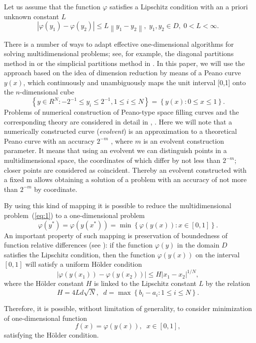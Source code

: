 \documentclass[smallcondensed]{svjour3}     %
\begin{document}
Let us assume that the function $\varphi$ satisfies a Lipschitz condition with an a priori unknown constant $L$
\[
\left|\varphi(y_1)-\varphi(y_2)\right|\leq L\left\|y_1-y_2\right\|,\; y_1,y_2 \in D,\; 0<L<\infty.
\]

There is a number of ways to adapt effective one-dimensional algorithms for solving multidimensional problems; see, for example, the diagonal partitions method in \cite{RefSergeyev2006} or the simplicial partitions method in \cite{RefZilinskas}. In this paper, we will use the approach based on the idea of dimension reduction by means of a Peano curve $y(x)$, which continuously and unambiguously maps the unit interval [0,1] onto the $n$-dimensional cube
\[
\left\{y\in R^N: -2^{-1}\leq y_i \leq 2^{-1}, 1 \leq i \leq N\right\}=\left\{y(x):0\leq x \leq 1 \right\}.
\]
Problems of numerical construction of Peano-type space filling curves and the corresponding theory are considered in detail in \cite{RefStrongin2000}, \cite{RefSergeyev2013}. Here we will note that a numerically constructed curve (\textit{evolvent}) is an approximation to a theoretical Peano curve with an accuracy $2^{-m}$ , where $m$ is an evolvent construction parameter. It means that using an evolvent we can distinguish points in a multidimensional space, the coordinates of which differ by not less than $2^{-m}$; closer points are considered as coincident. Thereby an evolvent constructed with a fixed m allows obtaining a solution of a problem with an accuracy of not more than $2^{-m}$ by coordinate.

By using this kind of mapping it is possible to reduce the multidimensional problem~(\ref{eq:1}) to a one-dimensional problem
\[
\varphi(y^\ast)=\varphi(y(x^\ast))=\min{\left\{\varphi(y(x)): x\in[0,1]\right\}}.
\]
An important property of such mapping is preservation of boundedness of function relative differences  (see \cite{RefStrongin2000}): if the function $\varphi(y)$ in the domain $D$ satisfies the Lipschitz condition, then the function $\varphi(y(x))$ on the interval $[0,1]$ will satisfy a uniform H{\"o}lder condition
\[
\left|\varphi(y(x_1))-\varphi(y(x_2))\right|\leq H\left|x_1-x_2\right|^{1/N},
\]
where the H{\"o}lder constant $H$ is linked to the Lipschitz constant $L$ by the relation
\[
H=4Ld\sqrt{N},\;\; d=\max{\left\{b_i-a_i:1\leq i \leq N\right\}}.
\]

Therefore, it is possible, without limitation of generality, to consider minimization of one-dimensional function
\[
f(x)=\varphi(y(x)), \;\; x\in[0,1],
\]
satisfying the H{\"o}lder condition.
\end{document}
